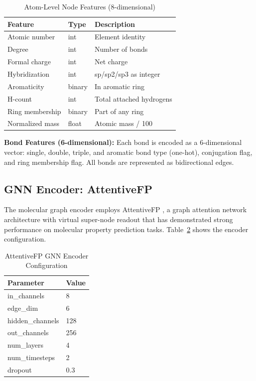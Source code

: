 \documentclass[conference]{IEEEtran}
\begin{document}
\begin{table}[htbp]
\caption{Atom-Level Node Features (8-dimensional)}
\label{tab:atom_features}
\centering
\begin{tabular}{@{}lll@{}}
\toprule
\textbf{Feature} & \textbf{Type} & \textbf{Description} \\
\midrule
Atomic number    & int     & Element identity \\
Degree           & int     & Number of bonds \\
Formal charge    & int     & Net charge \\
Hybridization    & int     & sp/sp2/sp3 as integer \\
Aromaticity      & binary  & In aromatic ring \\
H-count          & int     & Total attached hydrogens \\
Ring membership  & binary  & Part of any ring \\
Normalized mass  & float   & Atomic mass / 100 \\
\bottomrule
\end{tabular}
\end{table}

\textbf{Bond Features (6-dimensional):} Each bond is encoded as a 6-dimensional vector: single, double, triple, and aromatic bond type (one-hot), conjugation flag, and ring membership flag. All bonds are represented as bidirectional edges.

\subsection{GNN Encoder: AttentiveFP}
The molecular graph encoder employs AttentiveFP \cite{xiong2020}, a graph attention network architecture with virtual super-node readout that has demonstrated strong performance on molecular property prediction tasks. Table~\ref{tab:gnn_config} shows the encoder configuration.

\begin{table}[htbp]
\caption{AttentiveFP GNN Encoder Configuration}
\label{tab:gnn_config}
\centering
\begin{tabular}{@{}ll@{}}
\toprule
\textbf{Parameter} & \textbf{Value} \\
\midrule
in\_channels      & 8 \\
edge\_dim         & 6 \\
hidden\_channels  & 128 \\
out\_channels     & 256 \\
num\_layers       & 4 \\
num\_timesteps    & 2 \\
dropout           & 0.3 \\
\bottomrule
\end{tabular}
\end{table}
\end{document}
